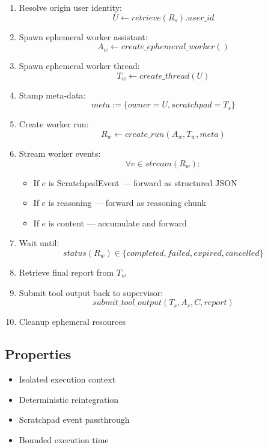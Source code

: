 \begin{enumerate}

\item Resolve origin user identity:
\[
U \leftarrow retrieve(R_s).user\_id
\]

\item Spawn ephemeral worker assistant:
\[
A_w \leftarrow create\_ephemeral\_worker()
\]

\item Spawn ephemeral worker thread:
\[
T_w \leftarrow create\_thread(U)
\]

\item Stamp meta-data:
\[
meta := \{ owner=U, scratchpad=T_s \}
\]

\item Create worker run:
\[
R_w \leftarrow create\_run(A_w, T_w, meta)
\]

\item Stream worker events:
\[
\forall e \in stream(R_w):
\]
\begin{itemize}
    \item If $e$ is ScratchpadEvent — forward as structured JSON
    \item If $e$ is reasoning — forward as reasoning chunk
    \item If $e$ is content — accumulate and forward
\end{itemize}

\item Wait until:
\[
status(R_w) \in \{completed, failed, expired, cancelled\}
\]

\item Retrieve final report from $T_w$

\item Submit tool output back to supervisor:
\[
submit\_tool\_output(T_s, A_s, C, report)
\]

\item Cleanup ephemeral resources

\end{enumerate}

\subsection*{Properties}

\begin{itemize}
    \item Isolated execution context
    \item Deterministic reintegration
    \item Scratchpad event passthrough
    \item Bounded execution time
\end{itemize}
